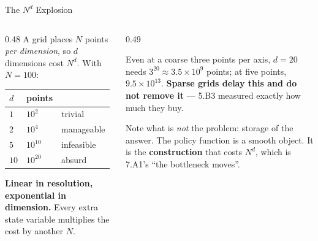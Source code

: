 \begin{frame}{The $N^{d}$ Explosion}
\begin{columns}[T]
\begin{column}{0.48\textwidth}
\small
A grid places $N$ points \emph{per dimension}, so $d$ dimensions cost $N^{d}$. With $N=100$:
\medskip
\begin{center}\footnotesize
\begin{tabularx}{\linewidth}{@{}>{\raggedright\arraybackslash}p{1.1cm} >{\raggedleft\arraybackslash}X >{\raggedright\arraybackslash}p{2.4cm}@{}}
\toprule
$d$ & \textbf{points} & \\
\midrule
$1$  & $10^{2}$  & trivial \\
$2$  & $10^{4}$  & manageable \\
$5$  & $10^{10}$ & infeasible \\
$10$ & $10^{20}$ & absurd \\
\bottomrule
\end{tabularx}
\end{center}
\medskip
\textbf{Linear in resolution, exponential in dimension.} Every extra state variable multiplies the cost by another $N$.
\end{column}
\begin{column}{0.49\textwidth}
\begin{cautionbox}[title=\textbf{And it is worse than it looks}]\small
Even at a coarse three points per axis, $d=20$ needs $3^{20}\approx3.5\times10^{9}$ points; at five points, $9.5\times10^{13}$.
\medskip
\textbf{Sparse grids delay this and do not remove it} --- 5.B3 measured exactly how much they buy.
\end{cautionbox}
\medskip
\begin{takeawaybox}\footnotesize
Note what is \emph{not} the problem: storage of the answer. The policy function is a smooth object. It is the \textbf{construction} that costs $N^{d}$, which is 7.A1's ``the bottleneck moves''.
\end{takeawaybox}
\end{column}
\end{columns}
\vspace{1mm}
\end{frame}

